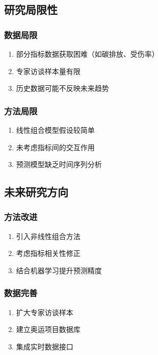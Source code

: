 \subsection{研究局限性}

\subsubsection{数据局限}

\begin{enumerate}
\item 部分指标数据获取困难（如碳排放、受伤率）
\item 专家访谈样本量有限
\item 历史数据可能不反映未来趋势
\end{enumerate}

\subsubsection{方法局限}

\begin{enumerate}
\item 线性组合模型假设较简单
\item 未考虑指标间的交互作用
\item 预测模型缺乏时间序列分析
\end{enumerate}

\subsection{未来研究方向}

\subsubsection{方法改进}

\begin{enumerate}
\item 引入非线性组合方法
\item 考虑指标相关性修正
\item 结合机器学习提升预测精度
\end{enumerate}

\subsubsection{数据完善}

\begin{enumerate}
\item 扩大专家访谈样本
\item 建立奥运项目数据库
\item 集成实时数据接口
\end{enumerate}

